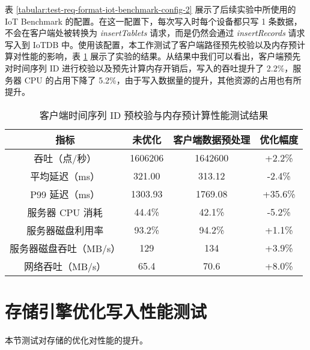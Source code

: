 表 \ref{tabular:test-req-format-iot-benchmark-config-2} 展示了后续实验中所使用的 IoT Benchmark 的配置。在这一配置下，每次写入时每个设备都只写 1 条数据，不会在客户端处被转换为 \emph{insertTablets} 请求，而是仍然会通过 \emph{insertRecords} 请求写入到 IoTDB 中。使用该配置，本工作测试了客户端路径预先校验以及内存预计算对性能的影响，表 \ref{tabular:client-offloading-performance} 展示了实验的结果。从结果中我们可以看出，客户端预先对时间序列 ID 进行校验以及预先计算内存开销后，写入的吞吐提升了 2.2\%，服务器 CPU 的占用下降了 5.2\%，由于写入数据量的提升，其他资源的占用也有所提升。

\begin{table}  
  \centering  
  \caption{客户端时间序列 ID 预校验与内存预计算性能测试结果}  
  \begin{tabular}{cccc}  
    \toprule   
    指标 & 未优化 & 客户端数据预处理 & 优化幅度 \\   
    \midrule  
    吞吐（点/秒） & 1606206 & 1642600 & +2.2\%\\  
    平均延迟（ms） & 321.00 & 313.12 & -2.4\%\\  
    P99 延迟（ms） & 1303.93 & 1769.08 & +35.6\% \\  
    服务器 CPU 消耗 & 44.4\% & 42.1\% & -5.2\%\\  
    服务器磁盘利用率 & 93.2\% & 94.2\% & +1.1\%\\  
    服务器磁盘吞吐（MB/s） & 129 & 134 & +3.9\% \\  
    网络吞吐（MB/s） & 65.4 & 70.6 & +8.0\%\\  
    \bottomrule   
  \end{tabular}  
  \label{tabular:client-offloading-performance}  
\end{table}

\section{存储引擎优化写入性能测试}
本节测试对存储的优化对性能的提升。
